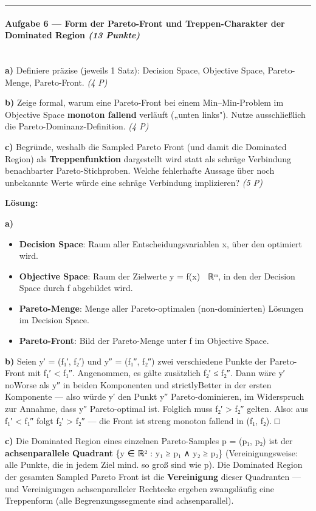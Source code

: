 \documentclass[11pt, a4paper]{article}
\begin{document}
\noindent\textcolor{rulegray}{\rule{\linewidth}{0.4pt}}


\paragraph{Aufgabe 6 — Form der Pareto-Front und Treppen-Charakter der Dominated Region \textit{(13 Punkte)}}\mbox{}\\[2pt]

\textbf{a)} Definiere präzise (jeweils 1 Satz): Decision Space, Objective Space, Pareto-Menge, Pareto-Front. \textit{(4 P)}


\textbf{b)} Zeige formal, warum eine Pareto-Front bei einem Min–Min-Problem im Objective Space \textbf{monoton fallend} verläuft („unten links"). Nutze ausschließlich die Pareto-Dominanz-Definition. \textit{(4 P)}


\textbf{c)} Begründe, weshalb die Sampled Pareto Front (und damit die Dominated Region) als \textbf{Treppenfunktion} dargestellt wird statt als schräge Verbindung benachbarter Pareto-Stichproben. Welche fehlerhafte Aussage über noch unbekannte Werte würde eine schräge Verbindung implizieren? \textit{(5 P)}


\textbf{Lösung:}


\textbf{a)}

\begin{itemize}
  \item \textbf{Decision Space}: Raum aller Entscheidungsvariablen x⃗, über den optimiert wird.
  \item \textbf{Objective Space}: Raum der Zielwerte y⃗ = f(x⃗) ∈ ℝᵐ, in den der Decision Space durch f abgebildet wird.
  \item \textbf{Pareto-Menge}: Menge aller Pareto-optimalen (non-dominierten) Lösungen im Decision Space.
  \item \textbf{Pareto-Front}: Bild der Pareto-Menge unter f im Objective Space.
\end{itemize}

\textbf{b)} Seien y⃗′ = (f₁′, f₂′) und y⃗″ = (f₁″, f₂″) zwei verschiedene Punkte der Pareto-Front mit f₁′ < f₁″. Angenommen, es gälte zusätzlich f₂′ ≤ f₂″. Dann wäre y⃗′ noWorse als y⃗″ in beiden Komponenten und strictlyBetter in der ersten Komponente — also würde y⃗′ den Punkt y⃗″ Pareto-dominieren, im Widerspruch zur Annahme, dass y⃗″ Pareto-optimal ist. Folglich muss f₂′ > f₂″ gelten. Also: aus f₁′ < f₁″ folgt f₂′ > f₂″ — die Front ist streng monoton fallend in (f₁, f₂). □


\textbf{c)} Die Dominated Region eines einzelnen Pareto-Samples p = (p₁, p₂) ist der \textbf{achsenparallele Quadrant} \{y ∈ ℝ² : y₁ ≥ p₁ ∧ y₂ ≥ p₂\} (Vereinigungsweise: alle Punkte, die in jedem Ziel mind. so groß sind wie p). Die Dominated Region der gesamten Sampled Pareto Front ist die \textbf{Vereinigung} dieser Quadranten — und Vereinigungen achsenparalleler Rechtecke ergeben zwangsläufig eine Treppenform (alle Begrenzungssegmente sind achsenparallel).
\end{document}
